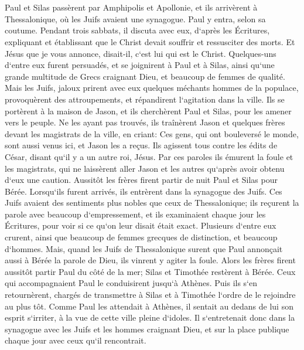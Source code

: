 \chapter{}

\verse Paul et Silas passèrent par Amphipolis et Apollonie, et ils arrivèrent à Thessalonique, où les Juifs avaient une synagogue. 
\verse Paul y entra, selon sa coutume. Pendant trois sabbats, il discuta avec eux, d`après les Écritures, 
\verse expliquant et établissant que le Christ devait souffrir et ressusciter des morts. Et Jésus que je vous annonce, disait-il, c`est lui qui est le Christ. 
\verse Quelques-uns d`entre eux furent persuadés, et se joignirent à Paul et à Silas, ainsi qu`une grande multitude de Grecs craignant Dieu, et beaucoup de femmes de qualité. 
\verse Mais les Juifs, jaloux prirent avec eux quelques méchants hommes de la populace, provoquèrent des attroupements, et répandirent l`agitation dans la ville. Ils se portèrent à la maison de Jason, et ils cherchèrent Paul et Silas, pour les amener vers le peuple. 
\verse Ne les ayant pas trouvés, ils traînèrent Jason et quelques frères devant les magistrats de la ville, en criant: Ces gens, qui ont bouleversé le monde, sont aussi venus ici, et Jason les a reçus. 
\verse Ils agissent tous contre les édits de César, disant qu`il y a un autre roi, Jésus. 
\verse Par ces paroles ils émurent la foule et les magistrats, 
\verse qui ne laissèrent aller Jason et les autres qu`après avoir obtenu d`eux une caution. 
\verse Aussitôt les frères firent partir de nuit Paul et Silas pour Bérée. Lorsqu`ils furent arrivés, ils entrèrent dans la synagogue des Juifs. 
\verse Ces Juifs avaient des sentiments plus nobles que ceux de Thessalonique; ils reçurent la parole avec beaucoup d`empressement, et ils examinaient chaque jour les Écritures, pour voir si ce qu`on leur disait était exact. 
\verse Plusieurs d`entre eux crurent, ainsi que beaucoup de femmes grecques de distinction, et beaucoup d`hommes. 
\verse Mais, quand les Juifs de Thessalonique surent que Paul annonçait aussi à Bérée la parole de Dieu, ils vinrent y agiter la foule. 
\verse Alors les frères firent aussitôt partir Paul du côté de la mer; Silas et Timothée restèrent à Bérée. 
\verse Ceux qui accompagnaient Paul le conduisirent jusqu`à Athènes. Puis ils s`en retournèrent, chargés de transmettre à Silas et à Timothée l`ordre de le rejoindre au plus tôt. 
\verse Comme Paul les attendait à Athènes, il sentait au dedans de lui son esprit s`irriter, à la vue de cette ville pleine d`idoles. 
\verse Il s`entretenait donc dans la synagogue avec les Juifs et les hommes craignant Dieu, et sur la place publique chaque jour avec ceux qu`il rencontrait. 
